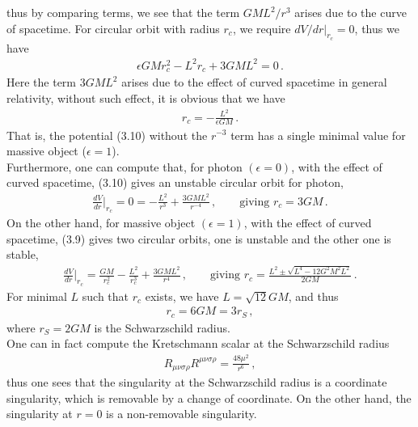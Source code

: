\documentclass[11pt, onesided]{book}
\theoremstyle{break}
\theoremstyle{break}
\begin{document}
thus by comparing terms, we see that the term $GML^2/r^3$ arises due to the curve of spacetime. For circular orbit with radius $r_c$, we require $dV/dr|_{r_c} = 0$, thus we have
\begin{align*}
\epsilon GMr_c^2 - L^2 r_c + 3GML^2 = 0\,.
\end{align*}
Here the term $3GML^2$ arises due to the effect of curved spacetime in general relativity, without such effect, it is obvious that we have
\begin{align*}
r_c = -\frac{L^2}{\epsilon GM}\,.
\end{align*}
That is, the potential (3.10) without the $r^{-3}$ term has a single minimal value for massive object ($\epsilon = 1$). \\

Furthermore, one can compute that, for photon $(\epsilon = 0)$, with the effect of curved spacetime, (3.10) gives an unstable circular orbit for photon,
\begin{align*}
\frac{dV}{dr}|_{r_c} = 0 = -\frac{L^2}{r^3} + \frac{3GML^2}{r^{-4}}\,,\qquad
\text{giving }r_c = 3GM\,.
\end{align*}
On the other hand, for massive object $(\epsilon = 1)$, with the effect of curved spacetime, (3.9) gives two circular orbits, one is unstable and the other one is stable,
\begin{align*}
\frac{dV}{dr}|_{r_c} = \frac{GM}{r_c^2} - \frac{L^2}{r_c^3} + \frac{3GML^2}{r^4}\,,\qquad \text{giving }
r_c = \frac{L^2 \pm \sqrt{L^4 - 12 G^2 M^2 L^2} }{2GM}\,.
\end{align*}
For minimal $L$ such that $r_c$ exists, we have $L = \sqrt{12}GM$, and thus
\begin{align*}
r_c = 6GM = 3r_S\,,
\end{align*}
where $r_S = 2GM$ is the Schwarzschild radius. \\

One can in fact compute the Kretschmann scalar at the Schwarzschild radius
\begin{align*}
R_{\mu\nu\sigma\rho}R^{\mu\nu\sigma\rho} = \frac{48\mu^2}{r^6}\,,
\end{align*}
thus one sees that the singularity at the Schwarzschild radius is a coordinate singularity, which is removable by a change of coordinate. On the other hand, the singularity at $r = 0$ is a non-removable singularity. \\
\end{document}
